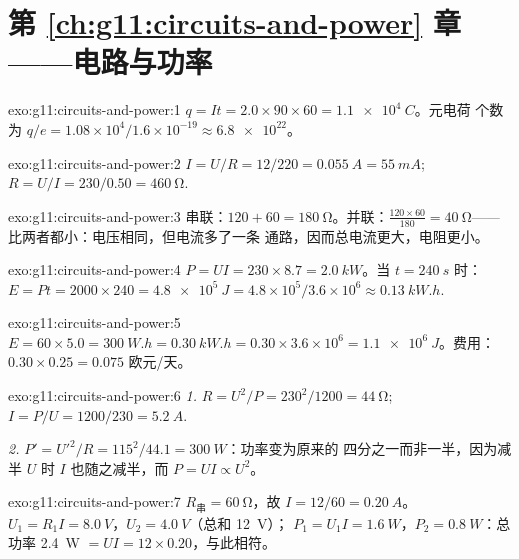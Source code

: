 \section*{第 \ref{ch:g11:circuits-and-power} 章——电路与功率}

\begin{solution}{exo:g11:circuits-and-power:1}
$q = It = 2.0 \times 90 \times 60 = \qty{1.1e4}{C}$。元电荷
个数为 $q/e = 1.08\times10^{4}/1.6\times10^{-19} \approx \num{6.8e22}$。
\end{solution}

\begin{solution}{exo:g11:circuits-and-power:2}
$I = U/R = 12/220 = \qty{0.055}{A} = \qty{55}{mA}$;
$R = U/I = 230/0.50 = \qty{460}{\ohm}$.
\end{solution}

\begin{solution}{exo:g11:circuits-and-power:3}
串联：$120 + 60 = \qty{180}{\ohm}$。并联：$\frac{120 \times 60}{180}
= \qty{40}{\ohm}$——比两者都小：电压相同，但电流多了一条
通路，因而总电流更大，电阻更小。
\end{solution}

\begin{solution}{exo:g11:circuits-and-power:4}
$P = UI = 230 \times 8.7 = \qty{2.0}{kW}$。当 $t = \qty{240}{s}$ 时：
$E = Pt = 2000 \times 240 = \qty{4.8e5}{J} = 4.8\times10^{5}/3.6
\times10^{6} \approx \qty{0.13}{kW.h}$.
\end{solution}

\begin{solution}{exo:g11:circuits-and-power:5}
$E = 60 \times 5.0 = \qty{300}{W.h} = \qty{0.30}{kW.h} = 0.30 \times
3.6\times10^{6} = \qty{1.1e6}{J}$。费用：$0.30 \times 0.25 = 0.075$
欧元/天。
\end{solution}

\begin{solution}{exo:g11:circuits-and-power:6}
\emph{1.} $R = U^2/P = 230^2/1200 = \qty{44}{\ohm}$;
$I = P/U = 1200/230 = \qty{5.2}{A}$.

\emph{2.} $P' = U'^2/R = 115^2/44.1 = \qty{300}{W}$：功率变为原来的
四分之一而非一半，因为减半 $U$ 时 $I$ 也随之减半，而 $P = UI \propto U^2$。
\end{solution}

\begin{solution}{exo:g11:circuits-and-power:7}
$R_{\text{串}} = \qty{60}{\ohm}$，故 $I = 12/60 = \qty{0.20}{A}$。
$U_1 = R_1 I = \qty{8.0}{V}$，$U_2 = \qty{4.0}{V}$（总和 \qty{12}{V}）；
$P_1 = U_1 I = \qty{1.6}{W}$，$P_2 = \qty{0.8}{W}$：总功率 \qty{2.4}{W}
$= UI = 12 \times 0.20$，与此相符。
\end{solution}

